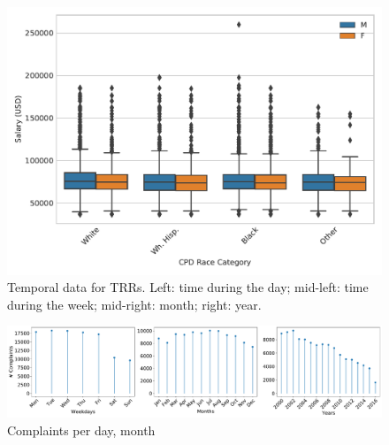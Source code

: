 \begin{figure}[h] 
	\includegraphics[width=\textwidth]{figs/salary_by_race_gender} 
	\caption{Temporal data for TRRs. Left: time during the day; mid-left: time during the week; mid-right: month; right: year.} \label{fig:salary_gender_race}
\end{figure}

\begin{figure}[h]
	\includegraphics[width=\textwidth, clip, trim= 0 0 460 0]{figs/complaints_times} 
\caption{Complaints per day, month}
\end{figure}




